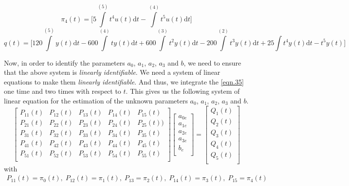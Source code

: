 \documentclass[letterpaper%
, twoside%
, 12pt%
,memoire%
, english%
,creativecommons,hyperref%
]{thETS}
\theoremstyle{newThmStyle}
\begin{document}
\begin{equation*}
\pi_{4}(t) = \bigg[5 \int\limits^{(5)} t^4 u(t) \mathrm{d}t - \int\limits^{(4)} t^5 u(t) \mathrm{d}t \bigg]
\end{equation*}
\begin{equation*}
q(t) = \bigg[120\int\limits^{(5)}y(t) \mathrm{d}t - 600\int\limits^{(4)}ty(t)\mathrm{d}t + 600\int\limits^{(3)}t^2y(t)\mathrm{d}t - 200\int\limits^{(2)}t^3y(t)\mathrm{d}t + 25\int t^4y(t)\mathrm{d}t- t^5y(t) \bigg]
\end{equation*}

\par Now, in order to identify the parameters $a_{0}$, $a_{1}$, $a_{2}$, $a_{3}$ and $b$, we need to ensure that the above system is \textit{linearly identifiable}. We need a system of linear equations to make them \textit{linearly identifiable}. And thus, we integrate the \eqref{eqn.35} one time and two times with respect to $t$. This gives us the following system of linear equation for the estimation of the unknown parameters $a_{0}$, $a_{1}$, $a_{2}$, $a_{3}$ and $b$.
\begin{equation}\label{eqn:98}
\begin{bmatrix}
P_{11}(t) & P_{12}(t) & P_{13}(t) & P_{14}(t) & P_{15}(t) \\
P_{21}(t) & P_{22}(t) & P_{23}(t) & P_{24}(t) & P_{25}(t)) \\
P_{31}(t) & P_{32}(t) & P_{33}(t) & P_{34}(t) & P_{35}(t) \\
P_{41}(t) & P_{42}(t) & P_{43}(t) & P_{44}(t) & P_{45}(t) \\
P_{51}(t) & P_{52}(t) & P_{53}(t) & P_{54}(t) & P_{55}(t) \\
\end{bmatrix}
\begin{bmatrix}
a_{0e} \\
a_{1e} \\
a_{2e} \\
a_{3e} \\
b_{e} \\
\end{bmatrix}
= 
\begin{bmatrix}
Q_{1}(t) \\
Q_{2}(t) \\
Q_{3}(t) \\
Q_{4}(t) \\
Q_{5}(t) \\
\end{bmatrix}
\end{equation}
with 
\begin{align*}
P_{11}(t) = \pi_{0}(t), \; P_{12}(t) = \pi_{1}(t), \; P_{13} = \pi_{2}(t), \; P_{14}(t) = \pi_{3}(t), \; P_{15} = \pi_{4}(t)
\end{align*}
\end{document}
